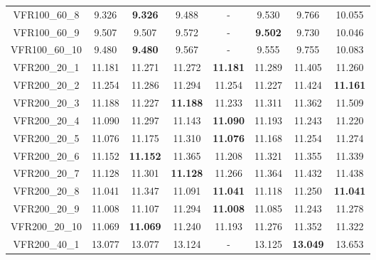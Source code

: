 \begin{tabular}{cc|ccc|ccc}
VFR100\_60\_8      & 9.326            & {\bf 9.326}      & 9.488            & -                & 9.530            & 9.766            & 10.055          \\ 
VFR100\_60\_9      & 9.507            & 9.507            & 9.572            & -                & {\bf 9.502}      & 9.730            & 10.046          \\ 
VFR100\_60\_10     & 9.480            & {\bf 9.480}      & 9.567            & -                & 9.555            & 9.755            & 10.083          \\ 
VFR200\_20\_1      & 11.181           & 11.271           & 11.272           & {\bf 11.181}     & 11.289           & 11.405           & 11.260          \\ 
VFR200\_20\_2      & 11.254           & 11.286           & 11.294           & 11.254           & 11.227           & 11.424           & {\bf 11.161}    \\ 
VFR200\_20\_3      & 11.188           & 11.227           & {\bf 11.188}     & 11.233           & 11.311           & 11.362           & 11.509          \\ 
VFR200\_20\_4      & 11.090           & 11.297           & 11.143           & {\bf 11.090}     & 11.193           & 11.243           & 11.220          \\ 
VFR200\_20\_5      & 11.076           & 11.175           & 11.310           & {\bf 11.076}     & 11.168           & 11.254           & 11.274          \\ 
VFR200\_20\_6      & 11.152           & {\bf 11.152}     & 11.365           & 11.208           & 11.321           & 11.355           & 11.339          \\ 
VFR200\_20\_7      & 11.128           & 11.301           & {\bf 11.128}     & 11.266           & 11.364           & 11.432           & 11.438          \\ 
VFR200\_20\_8      & 11.041           & 11.347           & 11.091           & {\bf 11.041}     & 11.118           & 11.250           & {\bf 11.041}    \\ 
VFR200\_20\_9      & 11.008           & 11.107           & 11.294           & {\bf 11.008}     & 11.085           & 11.243           & 11.278          \\ 
VFR200\_20\_10     & 11.069           & {\bf 11.069}     & 11.240           & 11.193           & 11.276           & 11.352           & 11.322          \\ 
VFR200\_40\_1      & 13.077           & 13.077           & 13.124           & -                & 13.125           & {\bf 13.049}     & 13.653          \\ 

\end{tabular}
